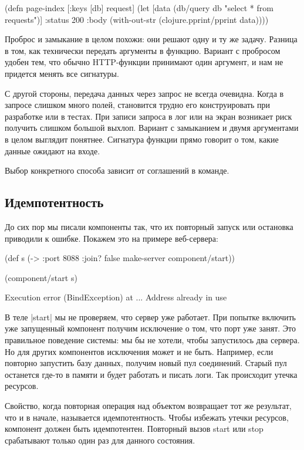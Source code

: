 \begin{code}
(defn page-index
  [{:keys [db]} request]
  (let [data (db/query db "select * from requests")]
    {:status 200
     :body (with-out-str
             (clojure.pprint/pprint data))}))
\end{code}

Проброс и замыкание в целом похожи: они решают одну и ту же задачу. Разница в
том, как технически передать аргументы в функцию. Вариант с пробросом удобен
тем, что обычно HTTP-функции принимают один аргумент, и нам не придется менять
все сигнатуры.

С другой стороны, передача данных через запрос не всегда очевидна. Когда в
запросе слишком много полей, становится трудно его конструировать при разработке
или в тестах. При записи запроса в лог или на экран возникает риск получить
слишком большой выхлоп. Вариант с замыканием и двумя аргументами в целом
выглядит понятнее. Сигнатура функции прямо говорит о том, какие данные ожидают
на входе.

Выбор конкретного способа зависит от соглашений в команде.

\subsection{Идемпотентность}

До сих пор мы писали компоненты так, что их повторный запуск или остановка
приводили к ошибке. Покажем это на примере веб-сервера:

\begin{code}
(def s (-> {:port 8088 :join? false}
           make-server
           component/start))

(component/start s)

Execution error (BindException) at ...
Address already in use
\end{code}


В теле \spverb|start| мы не проверяем, что сервер уже работает. При попытке включить
уже запущенный компонент получим исключение о том, что порт уже занят. Это
правильное поведение системы: мы бы не хотели, чтобы запустилось два сервера. Но
для других компонентов исключения может и не быть. Например, если повторно
запустить базу данных, получим новый пул соединений. Старый пул останется где-то
в памяти и будет работать и писать логи. Так происходит утечка ресурсов.

Свойство, когда повторная операция над объектом возвращает тот же результат, что
и в начале, называется идемпотентность. Чтобы избежать утечки ресурсов,
компонент должен быть идемпотентен. Повторный вызов start или stop срабатывают
только один раз для данного состояния.

